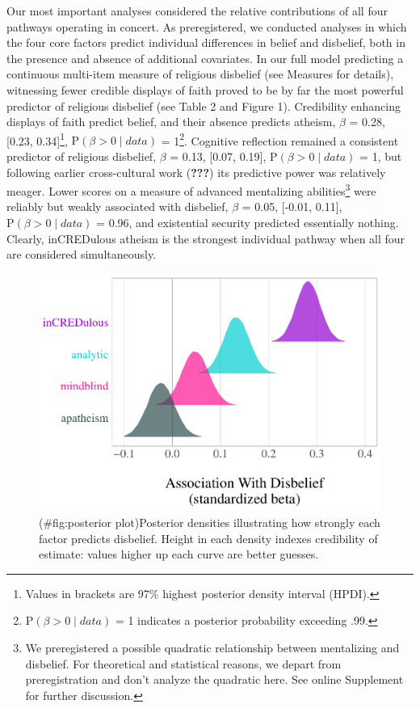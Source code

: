 \documentclass[english,man,mask]{article}
\begin{document}
Our most important analyses considered the relative contributions of all four pathways operating in concert. As preregistered, we conducted analyses in which the four core factors predict individual differences in belief and disbelief, both in the presence and absence of additional covariates. In our full model predicting a continuous multi-item measure of religious disbelief (see Measures for details), witnessing fewer credible displays of faith proved to be by far the most powerful predictor of religious disbelief (see Table 2 and Figure 1). Credibility enhancing displays of faith predict belief, and their absence predicts atheism, \(\beta\) = 0.28, {[}0.23, 0.34{]}\footnote{Values in brackets are 97\% highest posterior density interval (HPDI).}, \(\mathrm{P}(\beta > 0 \mid data)\) = 1\footnote{\(\mathrm{P}(\beta > 0 \mid data)\) = 1 indicates a posterior probability exceeding .99.}. Cognitive reflection remained a consistent predictor of religious disbelief, \(\beta\) = 0.13, {[}0.07, 0.19{]}, \(\mathrm{P}(\beta > 0 \mid data)\) = 1, but following earlier cross-cultural work ({\textbf{???}}) its predictive power was relatively meager. Lower scores on a measure of advanced mentalizing abilities\footnote{We preregistered a possible quadratic relationship between mentalizing and disbelief. For theoretical and statistical reasons, we depart from preregistration and don't analyze the quadratic here. See online Supplement for further discussion.} were reliably but weakly associated with disbelief, \(\beta\) = 0.05, {[}-0.01, 0.11{]}, \(\mathrm{P}(\beta > 0 \mid data)\) = 0.96, and existential security predicted essentially nothing. Clearly, inCREDulous atheism is the strongest individual pathway when all four are considered simultaneously.

\begin{figure}
\centering
\includegraphics{papaja-version_files/figure-latex/posterior plot-1.pdf}
\caption{(\#fig:posterior plot)Posterior densities illustrating how strongly each factor predicts disbelief. Height in each density indexes credibility of estimate: values higher up each curve are better guesses.}
\end{figure}
\end{document}
